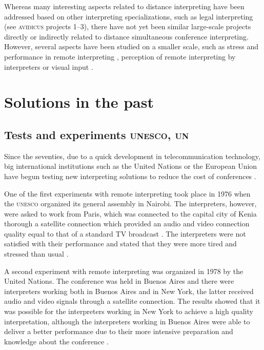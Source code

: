 \documentclass[output=paper]{langsci/langscibook}
\begin{document}
Whereas many interesting aspects related to distance interpreting have been addressed based on other interpreting specializations, such as legal interpreting (see \textsc{avidicus} projects 1--3), there have not yet been similar large-scale projects directly or indirectly related to distance simultaneous conference interpreting. However, several aspects have been studied on a smaller scale, such as stress and performance in remote interpreting \citep{Moser-Mercer2003,Roziner2010}, perception of remote interpreting by interpreters \citep{Mouzourakis2006} or visual input \citep{Rennert2008,Luisetto2016}.

\section{Solutions in the past}
\label{sec:ziegler:03}
\subsection{Tests and experiments \textsc{unesco}, \textsc{un}}
\label{sub:ziegler:3.1}
Since the seventies, due to a quick development in telecommunication technology, big international institutions such as the United Nations or the European Union have begun testing new interpreting solutions to reduce the cost of conferences \citep[26]{UNESCO1987}.

One of the first experiments with remote interpreting took place in 1976 when the \textsc{unesco} organized its general assembly in Nairobi. The interpreters, however, were asked to work from Paris, which was connected to the capital city of Kenia thorough a satellite connection which provided an audio and video connection quality equal to that of a standard TV broadcast \citep[30]{Mouzourakis1996}. The interpreters were not satisfied with their performance and stated that they were more tired and stressed than usual \citep[294]{Kurz2000}.

A second experiment with remote interpreting was organized in 1978 by the United Nations. The conference was held in Buenos Aires and there were interpreters working both in Buenos Aires and in New York, the latter received audio and video signals through a satellite connection. The results showed that it was possible for the interpreters working in New York to achieve a high quality interpretation, \citep[26]{UNESCO1987} although the interpreters working in Buenos Aires were able to deliver a better performance due to their more intensive preparation and knowledge about the conference \citep[82--90]{Chernov2004}. 
\end{document}
